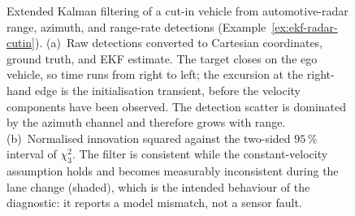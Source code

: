 \begin{figure}[!t]
\caption{Extended Kalman filtering of a cut-in vehicle from automotive-radar
range, azimuth, and range-rate detections (Example~\ref{ex:ekf-radar-cutin}).
(a)~Raw detections converted to Cartesian coordinates, ground truth, and EKF
estimate. The target closes on the ego vehicle, so time runs from right to left;
the excursion at the right-hand edge is the initialisation transient, before the
velocity components have been observed. The detection scatter is dominated by
the azimuth channel and therefore grows with range. (b)~Normalised innovation
squared against the two-sided $95\,\%$ interval of $\chi^{2}_{3}$. The filter is
consistent while the constant-velocity assumption holds and becomes measurably
inconsistent during the lane change (shaded), which is the intended behaviour of
the diagnostic: it reports a model mismatch, not a sensor fault.}
\label{fig:ekf-radar-cutin}
\end{figure}



